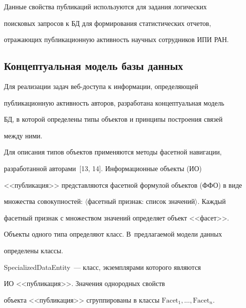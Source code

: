   Данные свойства публикаций используются для задания логических


поисковых запросов к БД для формирования статистических отчетов,


отражающих публикационную активность научных сотрудников ИПИ РАН.











\subsection{Концептуальная модель базы данных}








  Для реализации задач веб-доступа к информации, определяющей


публикационную активность авторов, разработана концептуальная модель


БД, в которой определены типы объектов и принципы построения связей


между ними.





  Для описания типов объектов применяются методы фасетной навигации,


разработанной авторами~[13, 14]. Информационные объекты (ИО)


<<публикация>> представляются фасетной формулой объектов (ФФО) в виде


множества совокупностей: $\langle$фасетный признак: список значений$\rangle$. Каждый


фасетный признак с множеством значений определяет объект <<фасет>>.


Объекты одного типа определяют класс. В~предлагаемой модели данных


определены классы.





  SpecializedDataEntity~--- класс, экземплярами которого являются


ИО <<пуб\-ли\-ка\-ция>>. Значения однородных свойств


объекта <<публикация>> сгруппированы в классы $\mathrm{Facet}_1, \ldots ,


\mathrm{Facet}_n$.





